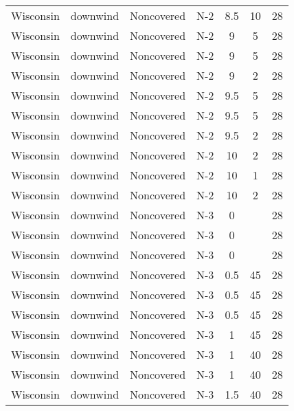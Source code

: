 \documentclass{article}
\begin{document}
\begin{longtable}[c]{ccccccc}
Wisconsin & downwind  & Noncovered & N-2             & 8.5          & 10          & 28  \\
Wisconsin & downwind  & Noncovered & N-2             & 9            & 5           & 28  \\
Wisconsin & downwind  & Noncovered & N-2             & 9            & 5           & 28  \\
Wisconsin & downwind  & Noncovered & N-2             & 9            & 2           & 28  \\
Wisconsin & downwind  & Noncovered & N-2             & 9.5          & 5           & 28  \\
Wisconsin & downwind  & Noncovered & N-2             & 9.5          & 5           & 28  \\
Wisconsin & downwind  & Noncovered & N-2             & 9.5          & 2           & 28  \\
Wisconsin & downwind  & Noncovered & N-2             & 10           & 2           & 28  \\
Wisconsin & downwind  & Noncovered & N-2             & 10           & 1           & 28  \\
Wisconsin & downwind  & Noncovered & N-2             & 10           & 2           & 28  \\
Wisconsin & downwind  & Noncovered & N-3             & 0            &             & 28  \\
Wisconsin & downwind  & Noncovered & N-3             & 0            &             & 28  \\
Wisconsin & downwind  & Noncovered & N-3             & 0            &             & 28  \\
Wisconsin & downwind  & Noncovered & N-3             & 0.5          & 45          & 28  \\
Wisconsin & downwind  & Noncovered & N-3             & 0.5          & 45          & 28  \\
Wisconsin & downwind  & Noncovered & N-3             & 0.5          & 45          & 28  \\
Wisconsin & downwind  & Noncovered & N-3             & 1            & 45          & 28  \\
Wisconsin & downwind  & Noncovered & N-3             & 1            & 40          & 28  \\
Wisconsin & downwind  & Noncovered & N-3             & 1            & 40          & 28  \\
Wisconsin & downwind  & Noncovered & N-3             & 1.5          & 40          & 28  \\

\end{longtable}
\end{document}
